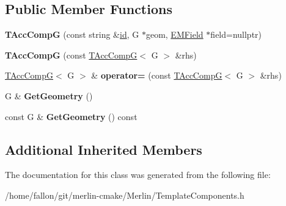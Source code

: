 \subsection*{Public Member Functions}
\begin{DoxyCompactItemize}
\item 
\mbox{\label{classTAccCompG_a6ee09ed39d7d38f0e76bcfea20501fe0}} 
{\bfseries T\+Acc\+CompG} (const string \&\hyperlink{classModelElement_aada171ead2085c75b592cf07d91bc5c2}{id}, G $\ast$geom, \hyperlink{classEMField}{E\+M\+Field} $\ast$field=nullptr)
\item 
\mbox{\label{classTAccCompG_a65d44410141187748f01fe1b9d5dc6eb}} 
{\bfseries T\+Acc\+CompG} (const \hyperlink{classTAccCompG}{T\+Acc\+CompG}$<$ G $>$ \&rhs)
\item 
\mbox{\label{classTAccCompG_a1dc163d935a27a704166c5a90024d1d4}} 
\hyperlink{classTAccCompG}{T\+Acc\+CompG}$<$ G $>$ \& {\bfseries operator=} (const \hyperlink{classTAccCompG}{T\+Acc\+CompG}$<$ G $>$ \&rhs)
\item 
\mbox{\label{classTAccCompG_ae4e8369649db4677d5b465cb3d632bf5}} 
G \& {\bfseries Get\+Geometry} ()
\item 
\mbox{\label{classTAccCompG_aa920723e5b546a67484b184544f62955}} 
const G \& {\bfseries Get\+Geometry} () const
\end{DoxyCompactItemize}
\subsection*{Additional Inherited Members}


The documentation for this class was generated from the following file\+:\begin{DoxyCompactItemize}
\item 
/home/fallon/git/merlin-\/cmake/\+Merlin/Template\+Components.\+h\end{DoxyCompactItemize}
